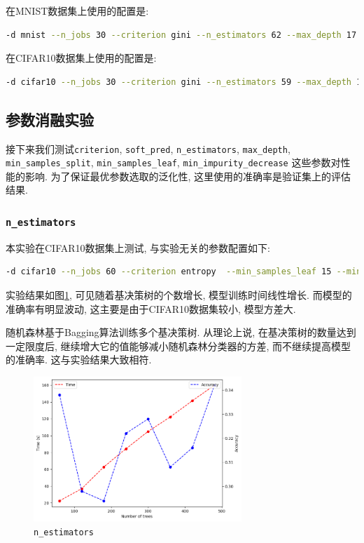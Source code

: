 \documentclass[a4paper]{article}
\begin{document}
在MNIST数据集上使用的配置是:
 \begin{lstlisting}[language=bash]
 -d mnist --n_jobs 30 --criterion gini --n_estimators 62 --max_depth 17 --min_samples_split 1 --min_samples_leaf 4 --min_impurity_decrease 1.086e-07
\end{lstlisting}

 在CIFAR10数据集上使用的配置是:
 \begin{lstlisting}[language=bash]
-d cifar10 --n_jobs 30 --criterion gini --n_estimators 59 --max_depth 13 --min_samples_split 4 --min_samples_leaf 10 --min_impurity_decrease 4.549e-11
\end{lstlisting}

\subsection{参数消融实验}\label{sec:rf_exp}
接下来我们测试\texttt{criterion}, \texttt{soft\_pred}, \texttt{n\_estimators}, \texttt{max\_depth}, \texttt{min\_samples\_split}, \texttt{min\_samples\_leaf}, \texttt{min\_impurity\_decrease} 这些参数对性能的影响.  为了保证最优参数选取的泛化性, 这里使用的准确率是验证集上的评估结果.

\subsubsection{\texttt{n\_estimators}}
本实验在CIFAR10数据集上测试, 与实验无关的参数配置如下:
 \begin{lstlisting}[language=bash]
-d cifar10 --n_jobs 60 --criterion entropy  --min_samples_leaf 15 --min_samples_split 50 --max_depth 20
\end{lstlisting}

实验结果如图\ref{fig:n_estimators}, 可见随着基决策树的个数增长, 模型训练时间线性增长. 而模型的准确率有明显波动, 这主要是由于CIFAR10数据集较小, 模型方差大.

随机森林基于Bagging算法训练多个基决策树. 从理论上说, 在基决策树的数量达到一定限度后, 继续增大它的值能够减小随机森林分类器的方差, 而不继续提高模型的准确率. 这与实验结果大致相符.

\begin{figure}[h]
    \centering
    \includegraphics[width=0.7\textwidth,height=0.4\textwidth]{figs/1.png}
    
    \caption{\texttt{n\_estimators}}
    \label{fig:n_estimators}
\end{figure}
\end{document}
